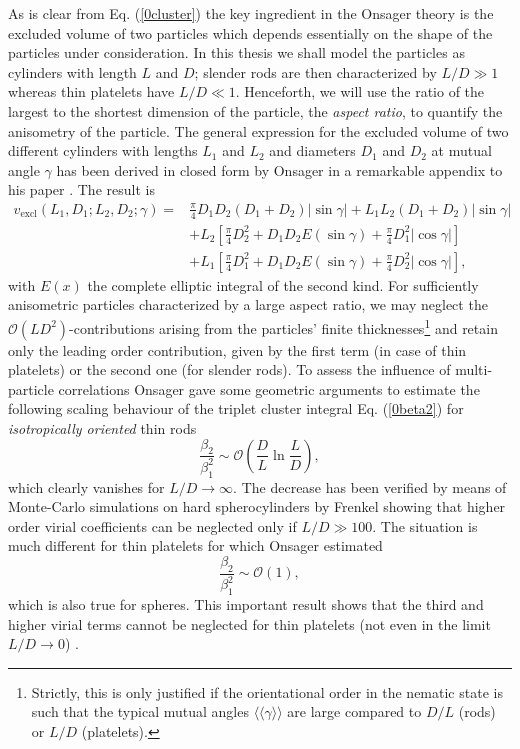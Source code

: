 {As is clear from Eq. (\ref{0cluster}) the key ingredient in the Onsager theory is the excluded volume of two particles
which depends essentially on the shape of the particles under consideration.
In this thesis we shall model the particles as cylinders with length $L$ and $D$;
slender rods are then characterized by  $L/D\gg 1$ whereas thin platelets
have $L/D\ll 1$. Henceforth, we will use the
ratio of the largest to the shortest dimension of the particle, the {\em aspect ratio}, to quantify the anisometry of the particle.
The general expression for the excluded volume of
two different cylinders with lengths $L_{1}$ and $L_{2}$ and diameters $D_{1}$ and $D_{2}$ at mutual angle
$\gamma$ has been derived
in closed form by Onsager in a remarkable appendix to his paper \cite{onsager1949}. The result is
\begin{align}
v_{\text{excl}}(L_{1},D_{1};L_{2},D_{2};\gamma)=& \frac{\pi}{4}D_{1}D_{2}(D_{1}+D_{2})\left|\sin\gamma\right| +L_{1}L_{2}(D_{1}+D_{2})
\left|\sin\gamma\right| \nonumber  \\
&+L_{2}\left[\frac{\pi}{4}D_{2}^{2}+D_{1}D_{2}E(\sin\gamma)+\frac{\pi}{4}D_{1}^{2} \left|\cos\gamma \right| \right] \nonumber \\
&+L_{1}\left[\frac{\pi}{4}D_{1}^{2}+D_{1}D_{2}E(\sin\gamma)+\frac{\pi}{4}D_{2}^{2} \left|\cos\gamma \right| \right],
\label{0evonsager}
\end{align}
with $E(x)$ the complete elliptic integral of the second kind. For sufficiently anisometric particles characterized by a  large aspect ratio,
we may neglect the $\mathcal{O}(LD^{2})$-contributions arising from the particles' finite thicknesses\footnote{Strictly,
this is only justified if the orientational order in the nematic state is such that the  typical mutual angles $ \langle\langle\gamma \rangle\rangle $ are large compared
to $D/L$ (rods) or $L/D$ (platelets).} and  retain
only the leading order contribution, given by the first term (in case of thin platelets)
or the second one (for slender rods).
To assess the influence of  multi-particle correlations
Onsager gave some geometric arguments to estimate the following scaling behaviour of the triplet cluster integral
Eq. (\ref{0beta2}) for {\em isotropically oriented} thin rods
\begin{equation}
\frac{\beta_{2}}{\beta_{1}^{2}}\sim \mathcal{O}\left(\frac{D}{L}\ln\frac{L}{D}\right),
\end{equation}
which clearly vanishes for $L/D \rightarrow \infty $.
The decrease  has been  verified by means of Monte-Carlo simulations on hard spherocylinders by Frenkel
\cite{Frenkel87,Frenkel87err}
showing that higher order virial coefficients can be neglected only if $L/D\gg 100$.
The situation is much different for thin platelets for which Onsager estimated
\begin{equation}
\frac{\beta_{2}}{\beta_{1}^{2}}\sim \mathcal{O}(1), \label{0clusterplate}
\end{equation}
which is also true for spheres. This important result shows that the third and higher
virial terms cannot be neglected for thin platelets (not even in the limit $L/D\rightarrow 0$) \cite{Veerman}.

}
